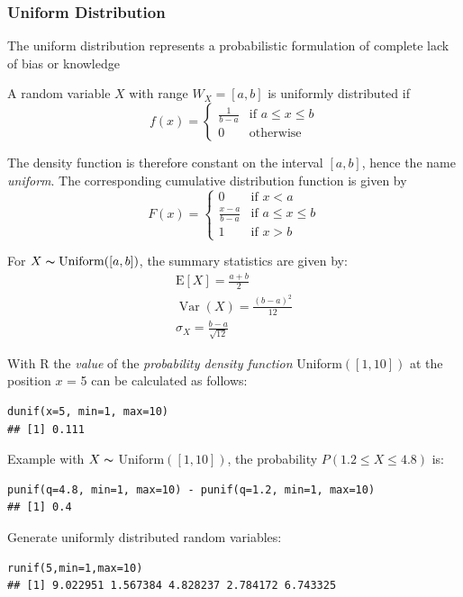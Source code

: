 \documentclass[11pt]{article}
\newcommand*\ev[1]{\mathrel{\text{E}\left[#1\right]}}
\newcommand*\Var[1]{\mathop{\text{Var}}\left(#1\right)}
\begin{document}
\subsubsection{Uniform Distribution}
The uniform distribution represents a probabilistic formulation of complete lack of bias or knowledge
\begin{definition}
	A random variable $X$ with range $W_X = [a,b]$ is uniformly distributed if
	\begin{equation*}
		f(x) = \left\{
			\begin{matrix}
				\frac{1}{b-a} & \text{if } a\leq x \leq b\\
				0 & \text{otherwise}
			\end{matrix}
		\right.
	\end{equation*}
\end{definition}
The density function is therefore constant on the interval $[a,b]$, hence the name \emph{uniform}. The corresponding cumulative distribution function is given by
\begin{equation*}
	F(x) = \left\{
		\begin{matrix}
			0 & \text{if } x < a\\
			\frac{x-a}{b-a} & \text{if } a\leq x \leq b\\
			1 & \text{if } x > b
		\end{matrix}
		\right.
\end{equation*}

For $X \thicksim \text{Uniform}([a, b])$, the summary statistics are given by:
\begin{gather*}
	\ev{X} = \frac{a+b}{2}\\
	\Var{X} = \frac{(b-a)^2}{12}\\
	\sigma_X = \frac{b-a}{\sqrt{12}}
\end{gather*}

With R the \textit{value} of the \textit{probability density function} Uniform$([1, 10])$ at the position $x$ = 5 can be calculated as follows:
\begin{verbatim}
dunif(x=5, min=1, max=10)
## [1] 0.111
\end{verbatim}

Example with $X \thicksim$ Uniform$([1, 10])$, the probability $P(1.2 \leq X \leq 4.8)$ is:
\begin{verbatim}
punif(q=4.8, min=1, max=10) - punif(q=1.2, min=1, max=10)
## [1] 0.4
\end{verbatim}

Generate uniformly distributed random variables: 
\begin{verbatim}
runif(5,min=1,max=10)
## [1] 9.022951 1.567384 4.828237 2.784172 6.743325
\end{verbatim}
\end{document}
